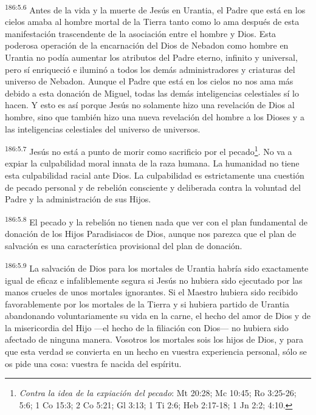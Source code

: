 \par
\textsuperscript{186:5.6} Antes de la vida y la muerte de Jesús en Urantia, el Padre que está en los cielos amaba al hombre mortal de la Tierra tanto como lo ama después de esta manifestación trascendente de la asociación entre el hombre y Dios. Esta poderosa operación de la encarnación del Dios de Nebadon como hombre en Urantia no podía aumentar los atributos del Padre eterno, infinito y universal, pero sí enriqueció e iluminó a todos los demás administradores y criaturas del universo de Nebadon. Aunque el Padre que está en los cielos no nos ama más debido a esta donación de Miguel, todas las demás inteligencias celestiales sí lo hacen. Y esto es así porque Jesús no solamente hizo una revelación de Dios al hombre, sino que también hizo una nueva revelación del hombre a los Dioses y a las inteligencias celestiales del universo de universos.

\par
\textsuperscript{186:5.7} Jesús no está a punto de morir como sacrificio por el pecado\footnote{\textit{Contra la idea de la expiación del pecado}: Mt 20:28; Mc 10:45; Ro 3:25-26; 5:6; 1 Co 15:3; 2 Co 5:21; Gl 3:13; 1 Ti 2:6; Heb 2:17-18; 1 Jn 2:2; 4:10.}. No va a expiar la culpabilidad moral innata de la raza humana. La humanidad no tiene esta culpabilidad racial ante Dios. La culpabilidad es estrictamente una cuestión de pecado personal y de rebelión consciente y deliberada contra la voluntad del Padre y la administración de sus Hijos.

\par
\textsuperscript{186:5.8} El pecado y la rebelión no tienen nada que ver con el plan fundamental de donación de los Hijos Paradisiacos de Dios, aunque nos parezca que el plan de salvación es una característica provisional del plan de donación.

\par
\textsuperscript{186:5.9} La salvación de Dios para los mortales de Urantia habría sido exactamente igual de eficaz e infaliblemente segura si Jesús no hubiera sido ejecutado por las manos crueles de unos mortales ignorantes. Si el Maestro hubiera sido recibido favorablemente por los mortales de la Tierra y si hubiera partido de Urantia abandonando voluntariamente su vida en la carne, el hecho del amor de Dios y de la misericordia del Hijo ---el hecho de la filiación con Dios--- no hubiera sido afectado de ninguna manera. Vosotros los mortales sois los hijos de Dios, y para que esta verdad se convierta en un hecho en vuestra experiencia personal, sólo se os pide una cosa: vuestra fe nacida del espíritu.